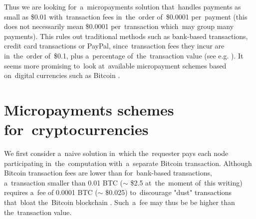 \documentclass[a4paper]{article}
\newcommand{\BTC}{BTC}
\begin{document}
    Thus we are looking for~a~micropayments solution that~handles payments as small as \$0.01 with~transaction fees
    in~the~order of~\$0.0001 per~payment (this does not necessarily mean \$0.0001 per~transaction which~may group many
    payments). This rules out traditional methods such as bank-based transactions, credit card transactions or PayPal,
    since~transaction fees they incur are in~the~order of~\$0.1, plus a~percentage of~the~transaction value
    (see e.g. \cite{FRS}).
    It seems more promising to~look at~available micropayment schemes based on~digital currencies such
    as Bitcoin \cite{BITCOIN}.

\section{Micropayments schemes for~cryptocurrencies}

    We first consider a~naive solution in~which the~requester pays each node participating in~the~computation
    with~a~separate Bitcoin transaction. Although Bitcoin transaction fees are lower than for~bank-based transactions,
    a~transaction smaller than 0.01 \BTC{} ($\sim$ \$2.5 at~the~moment of~this writing) requires a~fee of
    0.0001 \BTC{} ($\sim$ \$0.025) to~discourage "dust" transactions that~bloat the~Bitcoin blockchain \cite{BITFEE}.
    Such~a~fee may thus be be higher than the~transaction value.
\end{document}

